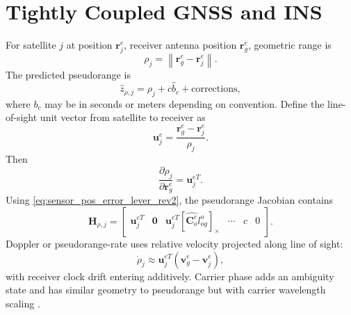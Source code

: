 \documentclass[11pt,oneside]{book}
\renewcommand{\skew}[1]{\left[#1\right]_{\times}}
\newcommand{\vb}{\mathbf{v}}
\newcommand{\rb}{\mathbf{r}}
\newcommand{\zero}{\mathbf{0}}
\newcommand{\Coe}{\mathbf{C}^{e}_{o}}
\newcommand{\norm}[1]{\left\lVert #1 \right\rVert}
\begin{document}
\section{Tightly Coupled GNSS and INS}
For satellite $j$ at position $\rb_j^e$, receiver antenna position $\rb_g^e$, geometric range is
\begin{equation}
\rho_j=\norm{\rb_g^e-\rb_j^e}.
\end{equation}
The predicted pseudorange is
\begin{equation}
\hat z_{\rho,j}=\rho_j+c\hat b_c+\text{corrections},
\end{equation}
where $b_c$ may be in seconds or meters depending on convention. Define the line-of-sight unit vector from satellite to receiver as
\begin{equation}
\mathbf{u}_j^e=\frac{\rb_g^e-\rb_j^e}{\rho_j}.
\end{equation}
Then
\begin{equation}
\frac{\partial \rho_j}{\partial \rb_g^e}=\mathbf{u}_j^{eT}.
\end{equation}
Using \cref{eq:sensor_pos_error_lever_rev2}, the pseudorange Jacobian contains
\begin{equation}
\mathbf{H}_{\rho,j}=\begin{bmatrix}
\mathbf{u}_j^{eT} & \zero & \mathbf{u}_j^{eT}\skew{\hat{\Coe}l_{og}^o} & \cdots & c & 0
\end{bmatrix}.
\end{equation}
Doppler or pseudorange-rate uses relative velocity projected along line of sight:
\begin{equation}
\dot\rho_j\approx \mathbf{u}_j^{eT}\left(\vb_g^e-\vb_j^e\right),
\end{equation}
with receiver clock drift entering additively. Carrier phase adds an ambiguity state and has similar geometry to pseudorange but with carrier wavelength scaling \cite{groves2013,kaplan2017,grewal2020}.
\end{document}
